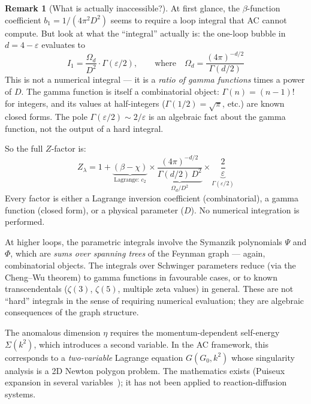 \documentclass[11pt,a4paper]{article}
\theoremstyle{definition}
\newtheorem*{remark}{Remark}
\begin{document}
\begin{remark}[What is actually inaccessible?]
At first glance, the $\beta$-function coefficient $b_1 = 1/(4\pi^2 D^2)$
seems to require a loop integral that AC cannot compute. But look at what
the ``integral'' actually is: the one-loop bubble in $d = 4 - \varepsilon$
evaluates to
\[
I_1 = \frac{\Omega_d}{D^2} \cdot \Gamma(\varepsilon/2),
\qquad\text{where}\quad
\Omega_d = \frac{(4\pi)^{-d/2}}{\Gamma(d/2)}
\]
This is not a numerical integral --- it is a \emph{ratio of gamma
functions} times a power of $D$. The gamma function is itself a
combinatorial object: $\Gamma(n) = (n{-}1)!$ for integers, and its
values at half-integers ($\Gamma(1/2) = \sqrt{\pi}$, etc.) are known
closed forms. The pole $\Gamma(\varepsilon/2) \sim 2/\varepsilon$ is
an algebraic fact about the gamma function, not the output of a hard
integral.

So the full $Z$-factor is:
\[
Z_\lambda = 1 + \underbrace{(\beta - \chi)}_{\text{Lagrange: }c_2}
\times \underbrace{\frac{(4\pi)^{-d/2}}{\Gamma(d/2)\, D^2}}_{\Omega_d / D^2}
\times \underbrace{\frac{2}{\varepsilon}}_{\Gamma(\varepsilon/2)}
\]
Every factor is either a Lagrange inversion coefficient (combinatorial),
a gamma function (closed form), or a physical parameter ($D$). No
numerical integration is performed.

At higher loops, the parametric integrals involve the Symanzik
polynomials $\Psi$ and $\Phi$, which are \emph{sums over spanning
trees} of the Feynman graph --- again, combinatorial objects. The
integrals over Schwinger parameters reduce (via the Cheng--Wu theorem)
to gamma functions in favourable cases, or to known transcendentals
($\zeta(3)$, $\zeta(5)$, multiple zeta values) in general. These are
not ``hard'' integrals in the sense of requiring numerical evaluation;
they are algebraic consequences of the graph structure.

The anomalous dimension $\eta$ requires the momentum-dependent
self-energy $\Sigma(k^2)$, which introduces a second variable.
In the AC framework, this corresponds to a \emph{two-variable}
Lagrange equation $G(G_0, k^2)$ whose singularity analysis is a
2D Newton polygon problem. The mathematics exists (Puiseux
expansion in several variables~\cite{flajolet2009}); it has not
been applied to reaction-diffusion systems.
\end{remark}
\end{document}

